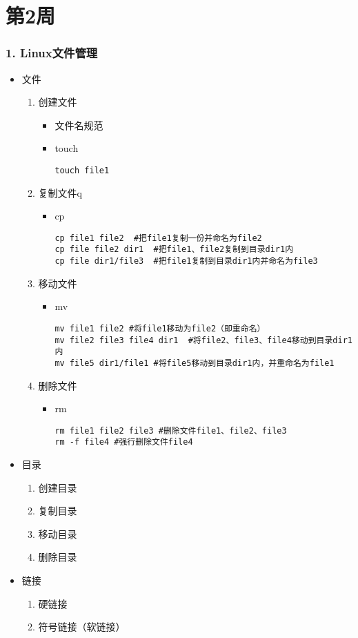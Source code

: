 \documentclass[bigger]{beamer}
\begin{document}
\section{第2周}
\label{sec-2}
\begin{frame}[fragile]
\frametitle{1. Linux文件管理}
\label{sec-2-1}

\begin{itemize}
\item 文件
\begin{enumerate}
\item 创建文件
\begin{itemize}
\item 文件名规范
\item touch

\begin{verbatim}
touch file1
\end{verbatim}
\end{itemize}
\item 复制文件q
\begin{itemize}
\item cp

\begin{verbatim}
cp file1 file2  #把file1复制一份并命名为file2
cp file file2 dir1  #把file1、file2复制到目录dir1内
cp file dir1/file3  #把file1复制到目录dir1内并命名为file3
\end{verbatim}
\end{itemize}
\item 移动文件
\begin{itemize}
\item mv

\begin{verbatim}
mv file1 file2 #将file1移动为file2（即重命名）
mv file2 file3 file4 dir1  #将file2、file3、file4移动到目录dir1内
mv file5 dir1/file1 #将file5移动到目录dir1内，并重命名为file1
\end{verbatim}
\end{itemize}
\item 删除文件
\begin{itemize}
\item rm

\begin{verbatim}
rm file1 file2 file3 #删除文件file1、file2、file3
rm -f file4 #强行删除文件file4
\end{verbatim}
\end{itemize}
\end{enumerate}
\item 目录
\begin{enumerate}
\item 创建目录
\item 复制目录
\item 移动目录
\item 删除目录
\end{enumerate}
\item 链接
\begin{enumerate}
\item 硬链接
\item 符号链接（软链接）
\end{enumerate}
\end{itemize}
\end{frame}
\end{document}
